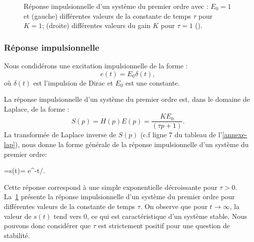 \begin{figure}[!t]
    \centering
    
    \hfill
    
    \caption{Réponse impulsionnelle d'un système du premier ordre avec : 
             $E_0=1$ et (gauche) différentes valeurs de la constante 
             de temps $\tau$ pour $K=1$; (droite) différentes valeurs 
             du gain $K$ pour $\tau=1$ ().\label{fig-1er_imp}}
\end{figure}

\subsubsection{Réponse impulsionnelle}
Nous condidérons une excitation impulsionnelle de la forme :
$$
e(t)=E_0\delta(t),
$$
où $\delta(t)$ est l'impulsion de Dirac et $E_0$ est une constante.

La réponse impulsionnelle d'un système du premier ordre est, dans le 
domaine de Laplace, de la forme :
$$
S(p)=H(p)E(p)=\dfrac{KE_0}{(\tau p+1)}.
$$
La transformée de Laplace inverse de $S(p)$ (c.f ligne 7 du tableau de 
l'\cref{annexe-lap}), nous donne la forme générale de la réponse impulsionnelle 
d'un système du premier ordre:
\begin{bequation}
    =s(t)= e^{-t/\tau}\label{eq-1er_imp}.
\end{bequation}
Cette réponse correspond à une simple exponentielle décroissante pour $\tau>0$.
La~\cref{fig-1er_imp} présente la réponse impulsionnelle d'un système 
du premier ordre pour différentes valeurs de la constante de temps $\tau$.
On observe que pour $t\to\infty$, la valeur de $s(t)$ tend vers 0, ce qui 
est caractéristique d'un système stable. Nous pouvons donc considérer que 
$\tau$ est strictement positif pour une question de stabilité.  

